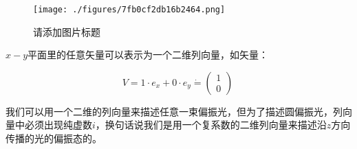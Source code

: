 \begin{figure}[ht]
\centering
\texttt{[image: ./figures/7fb0cf2db16b2464.png]}
\caption{请添加图片标题} \label{fig_QMPre2_26}
\end{figure}

$x-y$平面里的任意矢量可以表示为一个二维列向量，如矢量：

\begin{equation}
V = 1 \cdot e_x + 0 \cdot e_y  \dot =\left( \begin{array}{ccc} 1 \\ 0 \end{array} \right)~
\end{equation}

我们可以用一个二维的列向量来描述任意一束偏振光，但为了描述圆偏振光，列向量中必须出现纯虚数$i$，换句话说我们是用一个复系数的二维列向量来描述沿$z$方向传播的光的偏振态的。


